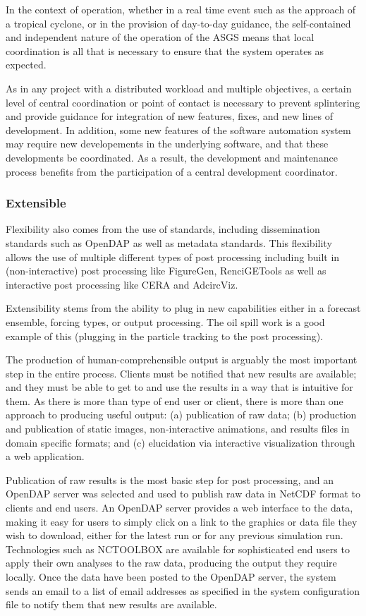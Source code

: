 \documentclass[12pt]{article}
\begin{document}
In the context of operation, whether in a real time event such as 
the approach of a tropical cyclone, or in the provision of 
day-to-day guidance, the self-contained and independent nature of 
the operation of the ASGS means that local coordination is all that is
necessary to ensure that the system operates as expected. 

As in any project with a distributed workload and multiple 
objectives, a certain level of central coordination or point of 
contact is necessary to prevent splintering and provide guidance for 
integration of new features, fixes, and new lines of development. In 
addition, some new features of the software automation system
may require new developements in the underlying software, and that these
developments be coordinated. As a result, the development and maintenance
process benefits from the participation of a central development 
coordinator. 


\subsubsection{Extensible}

Flexibility also comes from the use of standards, including 
dissemination standards such as OpenDAP as well as metadata 
standards. This flexibility allows the use of multiple different 
types of post processing including built in (non-interactive) post 
processing like FigureGen, RenciGETools as well as interactive post 
processing like CERA and AdcircViz.

Extensibility stems from the ability to plug in new capabilities
either in a forecast ensemble, forcing types, or output processing.
The oil spill work is a good example of this (plugging in the 
particle tracking to the post processing). 

The production of human-comprehensible output is arguably the most 
important step in the entire process. Clients must be notified that 
new results are available; and they must be able to get to and use 
the results in a way that is  intuitive for them. As there is more 
than type of end user or client, there is more than one approach to 
producing useful output: (a) publication of raw data; (b) production 
and publication of static images, non-interactive animations, and 
results files in domain specific formats; and (c) elucidation via 
interactive visualization through a web application.

Publication of raw results is the most basic step for post 
processing, and an OpenDAP server was selected and used to publish 
raw data in NetCDF format to clients and end users. An OpenDAP 
server provides a web interface to the data, making it easy for 
users to simply click on a link to the graphics or data file they 
wish to download, either for the latest run or for any previous 
simulation run.  Technologies such as NCTOOLBOX are available for 
sophisticated end users to apply their own analyses to the raw data, 
producing the output they require locally.  Once the data have been 
posted to the OpenDAP server, the system sends an email to a list of 
email addresses as specified in the system configuration file to 
notify them that new results are available. 
\end{document}
